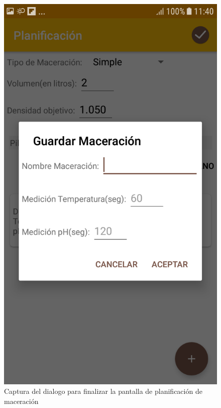                 \begin{figure}[h]
                    \centering
                     \includegraphics[scale=0.2]{software/ScreenCapture/PlanningActivity-Finish.jpg}
                    \caption{Captura del dialogo para finalizar la pantalla de planificación de maceración}
                    \label{fig:CapturaPlanFinish}
                \end{figure}

               
